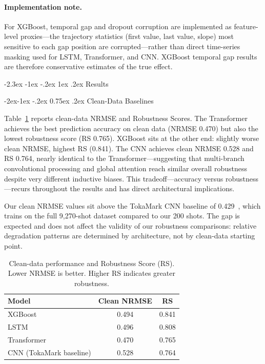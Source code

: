 \documentclass[10pt,twocolumn]{article}
\makeatletter
\renewcommand\section{\@startsection{section}{1}{\z@}%
  {-2.3ex \@plus -1ex \@minus -.2ex}%
  {1ex \@plus .2ex}%
  {\normalfont\Large\bfseries}}
\renewcommand\subsection{\@startsection{subsection}{2}{\z@}%
  {-2ex\@plus -1ex \@minus -.2ex}%
  {0.75ex \@plus .2ex}%
  {\normalfont\large\bfseries}}
\makeatother
\begin{document}
\paragraph{Implementation note.} For XGBoost, temporal gap and dropout
corruption are implemented as feature-level proxies—the trajectory
statistics (first value, last value, slope) most sensitive to each gap
position are corrupted—rather than direct time-series masking used
for LSTM, Transformer, and CNN. XGBoost temporal gap results are
therefore conservative estimates of the true effect.

\section{Results}

\subsection{Clean-Data Baselines}

Table~\ref{tab:clean} reports clean-data NRMSE and Robustness Scores.
The Transformer achieves the best prediction accuracy on clean data
(NRMSE 0.470) but also the lowest robustness score (RS 0.765). XGBoost
sits at the other end: slightly worse clean NRMSE, highest RS (0.841).
The CNN achieves clean NRMSE 0.528 and RS 0.764, nearly identical to
the Transformer—suggesting that multi-branch convolutional processing
and global attention reach similar overall robustness despite very
different inductive biases. This tradeoff—accuracy versus
robustness—recurs throughout the results and has direct architectural
implications.

Our clean NRMSE values sit above the TokaMark CNN
baseline of 0.429~\cite{rousseau2026tokamark}, which trains on the full
9,270-shot dataset compared to our 200 shots. The gap is expected and
does not affect the validity of our robustness comparisons: relative
degradation patterns are determined by architecture, not by clean-data
starting point.

\begin{table}[H]
\centering
\caption{Clean-data performance and Robustness Score (RS). Lower NRMSE
is better. Higher RS indicates greater robustness.}
\label{tab:clean}
\begin{tabular}{lcc}
\toprule
Model & Clean NRMSE & RS \\
\midrule
XGBoost                  & 0.494 & 0.841 \\
LSTM                     & 0.496 & 0.808 \\
Transformer              & 0.470 & 0.765 \\
CNN (TokaMark baseline)  & 0.528 & 0.764 \\
\bottomrule
\end{tabular}
\end{table}
\end{document}
